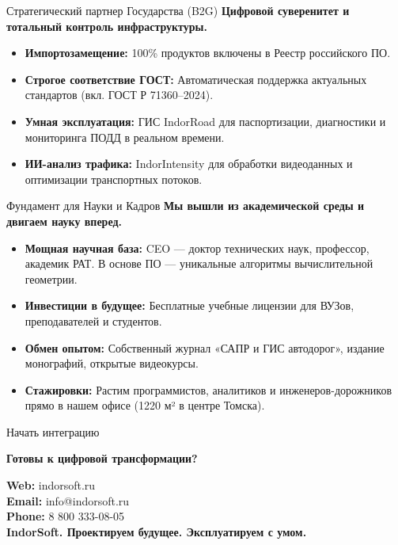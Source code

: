 \documentclass[aspectratio=169]{beamer}
\begin{document}
\begin{frame}{Стратегический партнер Государства (B2G)}
    \textbf{Цифровой суверенитет и тотальный контроль инфраструктуры.}
    \vspace{0.3cm}
    \begin{itemize}
        \item \textbf{Импортозамещение:} 100\% продуктов включены в Реестр российского ПО.
        \item \textbf{Строгое соответствие ГОСТ:} Автоматическая поддержка актуальных стандартов (вкл. ГОСТ Р 71360–2024).
        \item \textbf{Умная эксплуатация:} ГИС IndorRoad для паспортизации, диагностики и мониторинга ПОДД в реальном времени.
        \item \textbf{ИИ-анализ трафика:} IndorIntensity для обработки видеоданных и оптимизации транспортных потоков.
    \end{itemize}
\end{frame}

\begin{frame}{Фундамент для Науки и Кадров}
    \textbf{Мы вышли из академической среды и двигаем науку вперед.}
    \vspace{0.3cm}
    \begin{itemize}
        \item \textbf{Мощная научная база:} CEO — доктор технических наук, профессор, академик РАТ. В основе ПО — уникальные алгоритмы вычислительной геометрии.
        \item \textbf{Инвестиции в будущее:} Бесплатные учебные лицензии для ВУЗов, преподавателей и студентов.
        \item \textbf{Обмен опытом:} Собственный журнал «САПР и ГИС автодорог», издание монографий, открытые видеокурсы.
        \item \textbf{Стажировки:} Растим программистов, аналитиков и инженеров-дорожников прямо в нашем офисе (1220 м² в центре Томска).
    \end{itemize}
\end{frame}

\begin{frame}{Начать интеграцию}
    \begin{center}
        \Large \textcolor{NeonCyan}{\textbf{Готовы к цифровой трансформации?}}
        
        \vspace{0.8cm}
        \normalsize
        \textbf{Web:} indorsoft.ru \\
        \textbf{Email:} info@indorsoft.ru \\
        \textbf{Phone:} 8 800 333-08-05 \\
        \vspace{0.5cm}
        \textcolor{CyberPurple}{\textbf{IndorSoft. Проектируем будущее. Эксплуатируем с умом.}}
    \end{center}
\end{frame}
\end{document}
